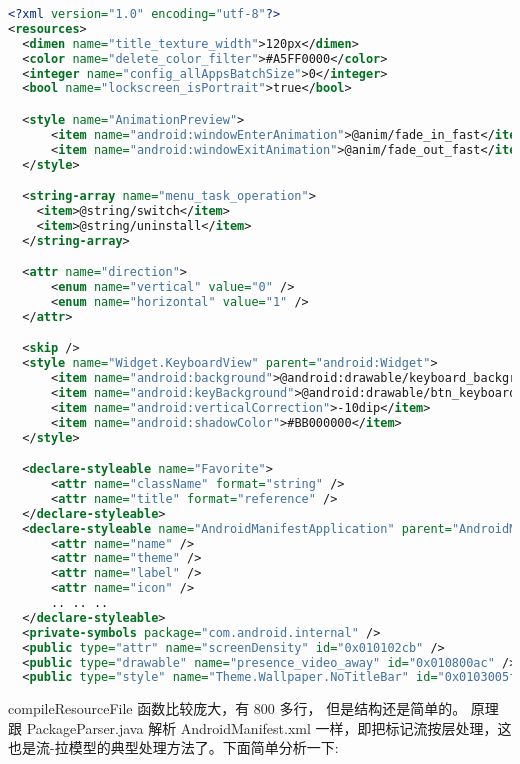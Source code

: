 \documentclass[a4paper,11pt]{article}
\begin{document}
\begin{lstlisting}[language=xml,label=xmlexam2,caption={Android XML 举例(续)}]
<?xml version="1.0" encoding="utf-8"?>
<resources>
  <dimen name="title_texture_width">120px</dimen>
  <color name="delete_color_filter">#A5FF0000</color>  
  <integer name="config_allAppsBatchSize">0</integer>
  <bool name="lockscreen_isPortrait">true</bool>

  <style name="AnimationPreview">
      <item name="android:windowEnterAnimation">@anim/fade_in_fast</item>
      <item name="android:windowExitAnimation">@anim/fade_out_fast</item>
  </style>

  <string-array name="menu_task_operation">
  	<item>@string/switch</item>
  	<item>@string/uninstall</item>
  </string-array>

  <attr name="direction">
      <enum name="vertical" value="0" />
      <enum name="horizontal" value="1" />
  </attr>

  <skip />
  <style name="Widget.KeyboardView" parent="android:Widget">
      <item name="android:background">@android:drawable/keyboard_background</item>
      <item name="android:keyBackground">@android:drawable/btn_keyboard_key</item>
      <item name="android:verticalCorrection">-10dip</item>
      <item name="android:shadowColor">#BB000000</item>
  </style>

  <declare-styleable name="Favorite">
      <attr name="className" format="string" />
      <attr name="title" format="reference" />
  </declare-styleable>
  <declare-styleable name="AndroidManifestApplication" parent="AndroidManifest">
      <attr name="name" />
      <attr name="theme" />
      <attr name="label" />
      <attr name="icon" />
      .. .. ..
  </declare-styleable>
  <private-symbols package="com.android.internal" />
  <public type="attr" name="screenDensity" id="0x010102cb" />
  <public type="drawable" name="presence_video_away" id="0x010800ac" />
  <public type="style" name="Theme.Wallpaper.NoTitleBar" id="0x0103005f" />

\end{lstlisting}
compileResourceFile 函数比较庞大，有 800 多行， 但是结构还是简单的。
原理跟 PackageParser.java 解析 AndroidManifest.xml
一样，即把标记流按层处理，这也是流-拉模型的典型处理方法了。下面简单分析一下:
\end{document}
